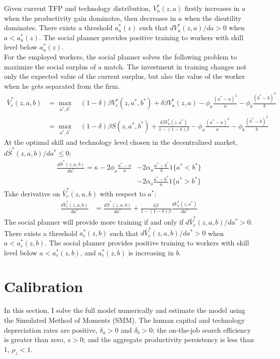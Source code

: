\documentclass[12pt]{article}
\newcommand{\1}{\mathbb{1}}
\begin{document}
Given current TFP and technology distribution, $V_u^*(z,a)$ firstly increases in $a$ when the productivity gain dominates, then decreases in $a$ when the disutility dominates. There exists a threshold $a_u^{*}(z)$ such that $d V_u^*(z,a)/d a>0$ when $a<a_u^{*}(z)$. The social planner provides positive training to workers with skill level below $a_u^{*}(z)$. \\

For the employed workers, the social planner solves the following problem to maximize the social surplus of a match. The investment in training changes not only the expected value of the current surplus, but also the value of the worker when he gets separated from the firm. 
\begin{align*}
\bar{V}_e^*(z,a,b) &= \max_{a^*,b^*} \quad (1-\delta)\beta V_e^*(z,a^*,b^*)+\delta\beta V_u^*(z,a)-\phi_a\frac{(a^*-a)^2}{a}-\phi_b\frac{(b^*-b)^2}{b} \\
 &= \max_{a^*,b^*} \quad (1-\delta)\beta S(z,a^*,b^*)+\frac{\delta\beta V_u^*(z,a^*)}{1-(1-\delta)\beta}-\phi_a\frac{(a^*-a)^2}{a}-\phi_b\frac{(b^*-b)^2}{b}
\end{align*}
At the optimal skill and technology level chosen in the decentralized market, $d\bar{S}^*(z,a,b)/d a^* \leq 0 $:  
\begin{align*}
\frac{d\bar{S}^*(z,a,b)}{d a^*} = \kappa-2\phi_a\frac{a^*-a}{a} &-2\alpha_u\frac{a^*-b^*}{b}1\{a^*<b^*\}	\\
																									&-2\alpha_o\frac{a^*-b^*}{a}1\{a^*>b^*\}
\end{align*}
Take derivative on $\bar{V}_e^*(z,a,b)$ with respect to $a^*$: 
\begin{align*}
\frac{d\bar{V}_e^*(z,a,b)}{d a^*}  & = \frac{d\bar{S}^*(z,a,b)}{d a^*} + \frac{\delta\beta}{1-(1-\delta)\beta}\frac{d V_u^*(z,a^*)}{d a^*} 
\end{align*}
The social planner will provide more training if and only if $d\bar{V}_e^*(z,a,b)/d a^*>0$. There exists a threshold $a_e^{*}(z,b)$ such that $d\bar{V}_e^*(z,a,b)/d a^*>0$ when $a<a_e^{*}(z,b)$. The social planner provides positive training to workers with skill level below $a<a_e^{*}(z,b)$, and $a_e^{*}(z,b)$ is increasing in $b$.  \\



\section{Calibration}
In this section, I solve the full model numerically and estimate the model using the Simulated Method of Moments (SMM). The human capital and technology depreciation rates are positive, $\delta_a>0$ and $\delta_b>0$; the on-the-job search efficiency is greater than zero, $s>0$; and the aggregate productivity persistency is less than 1, $\rho_z<1$. \\
\end{document}
